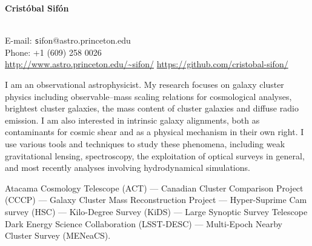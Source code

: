 \documentclass[11pt]{article}
\begin{document}
\begin{minipage}[b]{0.46\linewidth}
\flushleft
\hspace{-0.7cm}
{\bf\huge Crist\'obal Sif\'on}\\\vspace{0.2cm}
\\
\end{minipage}
\begin{minipage}[b]{0.49\linewidth}
\flushright
{\large E-mail: {\texttt sifon@astro.princeton.edu}\\
        Phone: +1 (609) 258 0026\\
        \url{http://www.astro.princeton.edu/~sifon/}
        \url{https://github.com/cristobal-sifon/}}
\end{minipage}
\vspace{0.4cm}
\hline




I am an observational astrophysicist. My research focuses on galaxy cluster physics including observable--mass scaling relations for cosmological analyses, brightest cluster galaxies, the mass content of cluster galaxies and diffuse radio emission. I am also interested in intrinsic galaxy alignments, both as contaminants for cosmic shear and as a physical mechanism in their own right. I use various tools and techniques to study these phenomena, including weak gravitational lensing, spectroscopy, the exploitation of optical surveys in general, and most recently analyses involving hydrodynamical simulations. %

\vspace{0.5cm}
{
 Atacama Cosmology Telescope (ACT) ---
 Canadian Cluster Comparison Project (CCCP) ---
 Galaxy Cluster Mass Reconstruction Project ---
 Hyper-Suprime Cam survey (HSC) ---
 Kilo-Degree Survey (KiDS) ---
 Large Synoptic Survey Telescope Dark Energy Science Collaboration (LSST-DESC) ---
 Multi-Epoch Nearby Cluster Survey (MENeaCS).
}
\end{document}
